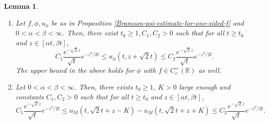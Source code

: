 \documentclass[a4paper,reqno]{amsart}%
\newcommand{\1}{\mathbf 1}
\theoremstyle{mine}
\numberwithin{theorem}{section}
\newtheorem{lemma}[theorem]{Lemma}
\numberwithin{equation}{section}
\theoremstyle{remark}
\begin{document}
\begin{lemma} \label{lemma_upper and lower for F-KPP}
\begin{enumerate}[label= (\alph*)]
    \item Let $f, \phi, u_\phi$ be as in Proposition \ref{Bramson-psi-estimate-for-one-sided-f} and $0<\alpha<\beta<\infty$. Then, there exist $t_0\ge 1, C_1, C_2 >0$ such that for all $t \ge t_0$ and $z \in [\alpha t, \beta t]$,
    \begin{equation}\label{quant-bound-for-super-critical}
        C_1\frac{e^{-\sqrt 2 z}}{\sqrt t}e^{-z^2/2t} \le u_\phi(t,z+\sqrt 2t)\le C_2\frac{e^{-\sqrt 2 z}}{\sqrt t}e^{-z^2/2t}.
    \end{equation}
The upper bound in the above holds for $\phi$ with $f\in C_c^+(\mathbb{R})$ as well. 
    \item Let $0< \alpha < \beta < \infty$. Then, there exists $t_0 \geq 1$, $K>0$ large enough and constants $C_1, C_2 >0$ such that for all $t\geq t_0$ and $z\in [\alpha t, \beta t]$,
    \begin{equation}\label{quant-bound-for-super-critical-for-difference}
        C_1\frac{e^{-\sqrt 2 z}}{\sqrt t}e^{-z^2/2t} \le u_M(t, \sqrt{2}t + z - K ) - u_M(t, \sqrt{2}t + z + K )\le C_2\frac{e^{-\sqrt 2 z}}{\sqrt t}e^{-z^2/2t}.
    \end{equation}
\end{enumerate}
    
\end{lemma}
\end{document}
